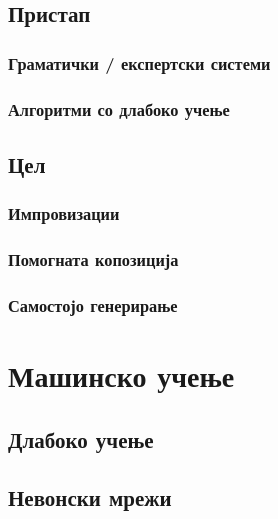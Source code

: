 \section{Пристап}

\subsection{Граматички / експертски системи} 
\subsection{Алгоритми со длабоко учење} 

\section{Цел}



\subsection{Импровизации} 
\subsection{Помогната копозиција} 
\subsection{Самостојо генерирање} 

\chapter{Машинско учење}

\section{Длабоко учење}

\section{Невонски мрежи}


